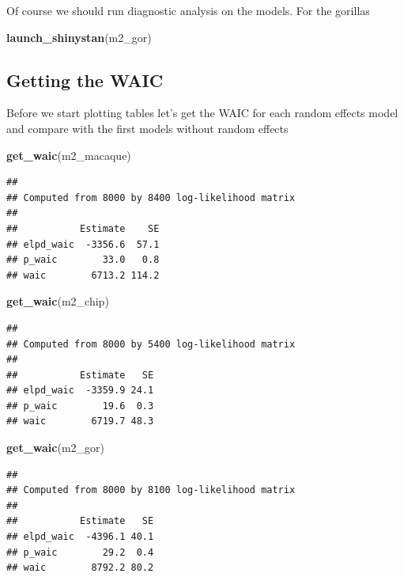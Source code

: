 \documentclass[
]{book}
\newenvironment{Shaded}{\begin{snugshade}}{\end{snugshade}}
\newcommand{\KeywordTok}[1]{\textcolor[rgb]{0.13,0.29,0.53}{\textbf{#1}}}
\newcommand{\NormalTok}[1]{#1}
\begin{document}
Of course we should run diagnostic analysis on the models. For the gorillas

\begin{Shaded}
\begin{Highlighting}[]
\KeywordTok{launch_shinystan}\NormalTok{(m2_gor)}
\end{Highlighting}
\end{Shaded}

\hypertarget{getting-the-waic-1}{%
\subsection{Getting the WAIC}\label{getting-the-waic-1}}

Before we start plotting tables let's get the WAIC for each random effects model and compare with the first models without random effects

\begin{Shaded}
\begin{Highlighting}[]
\KeywordTok{get_waic}\NormalTok{(m2_macaque)}
\end{Highlighting}
\end{Shaded}

\begin{verbatim}
## 
## Computed from 8000 by 8400 log-likelihood matrix
## 
##           Estimate    SE
## elpd_waic  -3356.6  57.1
## p_waic        33.0   0.8
## waic        6713.2 114.2
\end{verbatim}

\begin{Shaded}
\begin{Highlighting}[]
\KeywordTok{get_waic}\NormalTok{(m2_chip)}
\end{Highlighting}
\end{Shaded}

\begin{verbatim}
## 
## Computed from 8000 by 5400 log-likelihood matrix
## 
##           Estimate   SE
## elpd_waic  -3359.9 24.1
## p_waic        19.6  0.3
## waic        6719.7 48.3
\end{verbatim}

\begin{Shaded}
\begin{Highlighting}[]
\KeywordTok{get_waic}\NormalTok{(m2_gor)}
\end{Highlighting}
\end{Shaded}

\begin{verbatim}
## 
## Computed from 8000 by 8100 log-likelihood matrix
## 
##           Estimate   SE
## elpd_waic  -4396.1 40.1
## p_waic        29.2  0.4
## waic        8792.2 80.2
\end{verbatim}
\end{document}
